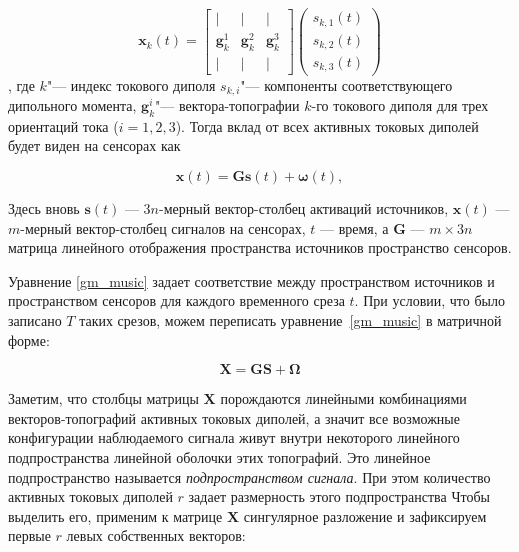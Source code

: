\begin{equation}
    \mathbf{x}_k(t) =
        \begin{bmatrix}
            |                 & |              & |              \\
            \mathbf{g}_k^1    & \mathbf{g}_k^2 & \mathbf{g}_k^3 \\
            |                 & |              & |
        \end{bmatrix}
        \left(\begin{array}{ccc}
                s_{k,1}(t)\\
                s_{k,2}(t)\\
                s_{k,3}(t)
            \end{array}
        \right)
\end{equation},
где $k$"--- индекс токового диполя $s_{k,i}$"--- компоненты соответствующего
дипольного момента,
$\mathbf{g}_k^i$"--- вектора-топографии $k$-го токового диполя
для трех ориентаций тока ($i=1,2,3$).
Тогда вклад от всех активных токовых диполей будет виден на сенсорах как

\begin{equation}
    \mathbf{x}(t) = \mathbf{G} \mathbf{s}(t) + \mathbf{\omega}(t),
    \label{gm_music}
\end{equation}

Здесь вновь $\mathbf{s}(t)$ --- $3n$-мерный вектор-столбец активаций источников,
$\mathbf{x}(t)$ --- $m$-мерный вектор-столбец сигналов на сенсорах,
$t$ --- время, а $\mathbf{G}$ --- $m \times 3n$ матрица линейного
отображения пространства источников пространство сенсоров.

Уравнение \ref{gm_music} задает соответствие между пространством источников и пространством
сенсоров для каждого временного среза $t$.
При условии, что было записано $T$ таких срезов,
можем переписать уравнение~\ref{gm_music} в матричной форме:

\begin{equation}
    \mathbf{X} = \mathbf{G} \mathbf{S} + \mathbf{\Omega}
    \label{gm_music_matrix}
\end{equation}

Заметим, что столбцы матрицы $\mathbf{X}$ порождаются линейными комбинациями
векторов-топографий активных токовых диполей, а значит все возможные конфигурации
наблюдаемого сигнала живут внутри некоторого линейного подпространства линейной оболочки этих
топографий. Это линейное подпространство называется \emph{подпространством сигнала}.
При этом количество активных токовых диполей $r$ задает размерность этого подпространства
Чтобы выделить его, применим к матрице $\mathbf{X}$
сингулярное разложение и зафиксируем первые $r$ левых собственных векторов:

